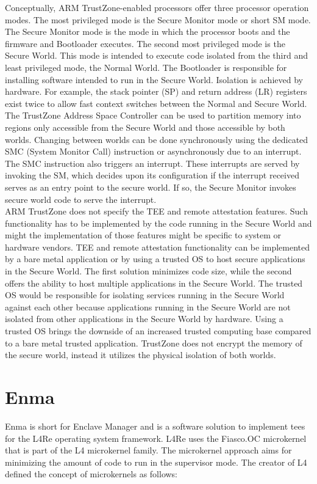 Conceptually, ARM TrustZone-enabled processors offer three processor operation
modes. The most privileged mode is the Secure Monitor mode or short SM mode. The
Secure Monitor mode is the mode in which the processor boots and the firmware
and Bootloader executes. The second most privileged mode is the Secure World.
This mode is intended to execute code isolated from the third and least
privileged mode, the Normal World. The Bootloader is responsible for installing
software intended to run in the Secure World. Isolation is achieved by hardware.
For example, the stack pointer (SP) and return address (LR) registers exist
twice to allow fast context switches between the Normal and Secure World. The
TrustZone Address Space Controller can be used to partition memory into regions
only accessible from the Secure World and those accessible by both worlds.
Changing between worlds can be done synchronously using the dedicated SMC
(System Monitor Call) instruction or asynchronously due to an interrupt. The SMC
instruction also triggers an interrupt. These interrupts are served by invoking
the SM, which decides upon its configuration if the interrupt received serves as
an entry point to the secure world. If so, the Secure Monitor invokes secure
world code to serve the interrupt.\\

ARM TrustZone does not specify the TEE and remote attestation features. Such
functionality has to be implemented by the code running in the Secure World and
might the implementation of those features might be specific to system or
hardware vendors. TEE and remote attestation functionality can be implemented by
a bare metal application or by using a trusted OS to host secure applications in
the Secure World. The first solution minimizes code size, while the second
offers the ability to host multiple applications in the Secure World. The
trusted OS would be responsible for isolating services running in the Secure
World against each other because applications running in the Secure World are
not isolated from other applications in the Secure World by hardware. Using a
trusted OS brings the downside of an increased trusted computing base compared
to a bare metal trusted application. TrustZone does not encrypt the memory of
the secure world, instead it utilizes the physical isolation of both worlds.\\

\section{Enma}
\label{sec:20:enma}
Enma is short for Enclave Manager and is a software solution to implement \glspl{tee}
for the L4Re operating system framework. \cite{reitz_isolierende_2019} L4Re uses
the Fiasco.OC microkernel that is part of the L4 microkernel family. The
microkernel approach aims for minimizing the amount of code to run in the
supervisor mode. The creator of L4 defined the concept of microkernels as
follows:

